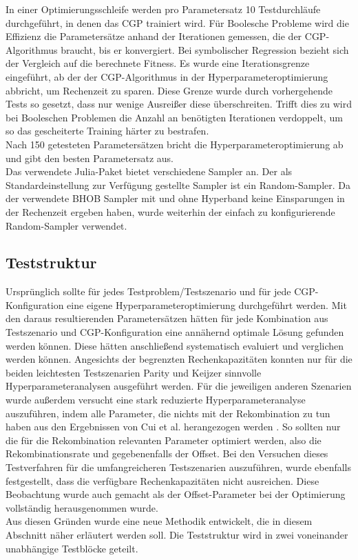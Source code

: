 In einer Optimierungsschleife werden pro Parametersatz 10 Testdurchläufe durchgeführt, in denen das CGP trainiert wird.
Für Boolesche Probleme wird die Effizienz die Parametersätze anhand der Iterationen gemessen, die der CGP-Algorithmus braucht, bis er konvergiert.
Bei symbolischer Regression bezieht sich der Vergleich auf die berechnete Fitness.
Es wurde eine Iterationsgrenze eingeführt, ab der der CGP-Algorithmus in der Hyperparameteroptimierung abbricht, um Rechenzeit zu sparen.
Diese Grenze wurde durch vorhergehende Tests so gesetzt, dass nur wenige Ausreißer diese überschreiten.
Trifft dies zu wird bei Booleschen Problemen die Anzahl an benötigten Iterationen verdoppelt, um so das gescheiterte Training härter zu bestrafen.\\
Nach 150 getesteten Parametersätzen bricht die Hyperparameteroptimierung ab und gibt den besten Parametersatz aus.\\

Das verwendete Julia-Paket bietet verschiedene Sampler an.
Der als Standardeinstellung zur Verfügung gestellte Sampler ist ein Random-Sampler.
Da der verwendete BHOB Sampler mit und ohne Hyperband keine Einsparungen in der Rechenzeit ergeben haben, wurde weiterhin der einfach zu konfigurierende Random-Sampler verwendet. 

\subsection{Teststruktur}
\label{subsec:struktur}

Ursprünglich sollte für jedes Testproblem/Testszenario und für jede CGP-Konfiguration eine eigene Hyperparameteroptimierung durchgeführt werden.
Mit den daraus resultierenden Parametersätzen hätten für jede Kombination aus Testszenario und CGP-Konfiguration eine annähernd optimale Lösung gefunden werden können.
Diese hätten anschließend systematisch evaluiert und verglichen werden können.
Angesichts der begrenzten Rechenkapazitäten konnten nur für die beiden leichtesten Testszenarien Parity und Keijzer sinnvolle Hyperparameteranalysen ausgeführt werden.
Für die jeweiligen anderen Szenarien wurde außerdem versucht eine stark reduzierte Hyperparameteranalyse auszuführen, indem alle Parameter, die nichts mit der Rekombination zu tun haben aus den Ergebnissen von Cui et al. herangezogen werden \cite{cui_results}.
So sollten nur die für die Rekombination relevanten Parameter optimiert werden, also die Rekombinationsrate und gegebenenfalls der Offset.
Bei den Versuchen dieses Testverfahren für die umfangreicheren Testszenarien auszuführen, wurde ebenfalls festgestellt, dass die verfügbare Rechenkapazitäten nicht ausreichen.
Diese Beobachtung wurde auch gemacht als der Offset-Parameter bei der Optimierung vollständig herausgenommen wurde.\\
Aus diesen Gründen wurde eine neue Methodik entwickelt, die in diesem Abschnitt näher erläutert werden soll.
Die Teststruktur wird in zwei voneinander unabhängige Testblöcke geteilt.

